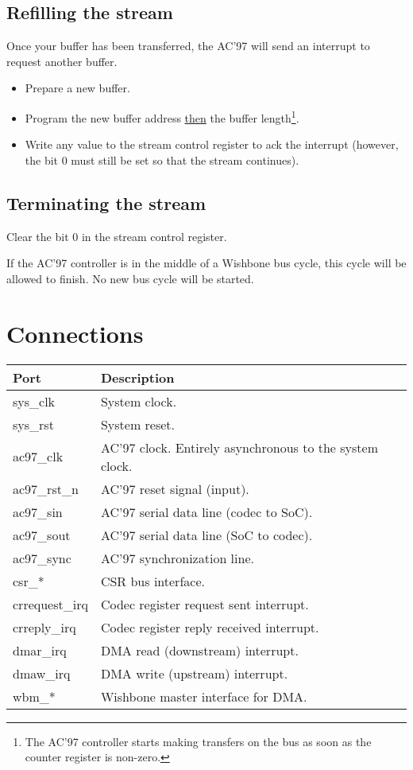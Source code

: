 \documentclass[a4paper,11pt]{article}
\begin{document}
\subsection{Refilling the stream}
Once your buffer has been transferred, the AC'97 will send an interrupt to request another buffer.
\begin{itemize}
\item Prepare a new buffer.
\item Program the new buffer address \underline{then} the buffer length\footnote{The AC'97 controller starts making transfers on the bus as soon as the counter register is non-zero.}.
\item Write any value to the stream control register to ack the interrupt (however, the bit 0 must still be set so that the stream continues).
\end{itemize}

\subsection{Terminating the stream}
Clear the bit 0 in the stream control register.

If the AC'97 controller is in the middle of a Wishbone bus cycle, this cycle will be allowed to finish. No new bus cycle will be started.

\section{Connections}

\begin{tabularx}{\textwidth}{|l|X|}
\hline
\textbf{Port} & \textbf{Description} \\
\hline
sys\_clk & System clock. \\
sys\_rst & System reset. \\
\hline
ac97\_clk & AC'97 clock. Entirely asynchronous to the system clock. \\
ac97\_rst\_n & AC'97 reset signal (input). \\
ac97\_sin & AC'97 serial data line (codec to SoC). \\
ac97\_sout & AC'97 serial data line (SoC to codec). \\
ac97\_sync & AC'97 synchronization line. \\
\hline
csr\_* & CSR bus interface. \\
\hline
crrequest\_irq & Codec register request sent interrupt. \\
crreply\_irq & Codec register reply received interrupt. \\
dmar\_irq & DMA read (downstream) interrupt. \\
dmaw\_irq & DMA write (upstream) interrupt. \\
\hline
wbm\_* & Wishbone master interface for DMA. \\
\hline
\end{tabularx}
\end{document}
